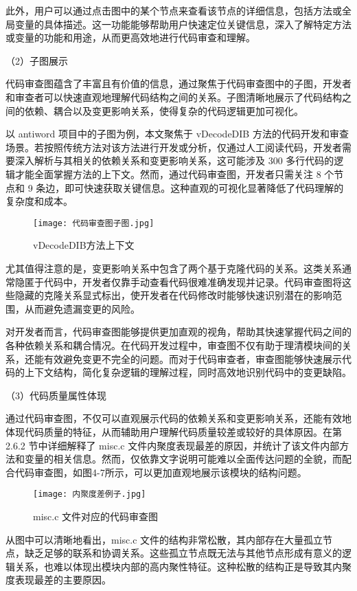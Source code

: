 此外，用户可以通过点击图中的某个节点来查看该节点的详细信息，包括方法或全局变量的具体描述。这一功能能够帮助用户快速定位关键信息，深入了解特定方法或变量的功能和用途，从而更高效地进行代码审查和理解。



（2）子图展示

代码审查图蕴含了丰富且有价值的信息，通过聚焦于代码审查图中的子图，开发者和审查者可以快速直观地理解代码结构之间的关系。子图清晰地展示了代码结构之间的依赖、耦合以及变更影响关系，使得复杂的代码逻辑更加可视化。

以 antiword 项目中的子图为例，本文聚焦于 vDecodeDIB 方法的代码开发和审查场景。若按照传统方法对该方法进行开发或分析，仅通过人工阅读代码，开发者需要深入解析与其相关的依赖关系和变更影响关系，这可能涉及 300 多行代码的逻辑才能全面掌握方法的上下文。然而，通过代码审查图，开发者只需关注 8 个节点和 9 条边，即可快速获取关键信息。这种直观的可视化显著降低了代码理解的复杂度和成本。

\begin{figure}[h]
\centering
\texttt{[image: 代码审查图子图.jpg]}
\caption{vDecodeDIB方法上下文}
\end{figure}

尤其值得注意的是，变更影响关系中包含了两个基于克隆代码的关系。这类关系通常隐匿于代码中，开发者仅靠手动查看代码很难准确发现并记录。代码审查图将这些隐藏的克隆关系显式标出，使开发者在代码修改时能够快速识别潜在的影响范围，从而避免遗漏变更的风险。

对开发者而言，代码审查图能够提供更加直观的视角，帮助其快速掌握代码之间的各种依赖关系和耦合情况。在代码开发过程中，审查图不仅有助于理清模块间的关系，还能有效避免变更不完全的问题。而对于代码审查者，审查图能够快速展示代码的上下文结构，简化复杂逻辑的理解过程，同时高效地识别代码中的变更缺陷。

（3）代码质量属性体现

通过代码审查图，不仅可以直观展示代码的依赖关系和变更影响关系，还能有效地体现代码质量的特征，从而辅助用户理解代码质量较差或较好的具体原因。在第 2.6.2 节中详细解释了 misc.c 文件内聚度表现最差的原因，并统计了该文件内部方法和变量的相关信息。然而，仅依靠文字说明可能难以全面传达问题的全貌，而配合代码审查图，如图4-7所示，可以更加直观地展示该模块的结构问题。

\begin{figure}[h]
\centering
\texttt{[image: 内聚度差例子.jpg]}
\caption{misc.c 文件对应的代码审查图}
\end{figure}

从图中可以清晰地看出，misc.c 文件的结构非常松散，其内部存在大量孤立节点，缺乏足够的联系和协调关系。这些孤立节点既无法与其他节点形成有意义的逻辑关系，也难以体现出模块内部的高内聚性特征。这种松散的结构正是导致其内聚度表现最差的主要原因。

